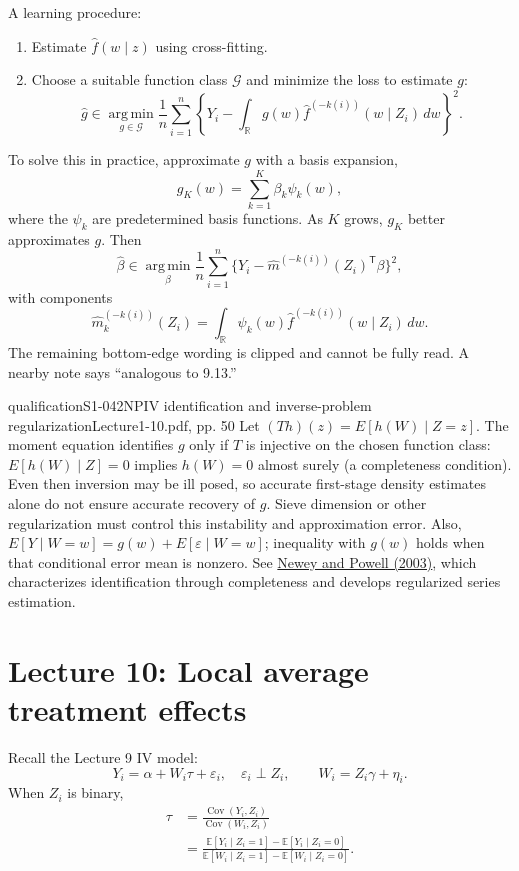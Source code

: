 A learning procedure:
\begin{enumerate}
 \item Estimate $\widehat f(w\mid z)$ using cross-fitting.
 \item Choose a suitable function class $\mathcal G$ and minimize the loss to estimate $g$:
 \[
 \widehat g\in\operatorname*{arg\,min}_{g\in\mathcal G}
 \frac1n\sum_{i=1}^n\left\{
 Y_i-\int_{\mathbb R}g(w)\widehat f^{(-k(i))}(w\mid Z_i)\,dw
 \right\}^{\!2}.\tag{9.16}
 \]
\end{enumerate}
To solve this in practice, approximate $g$ with a basis expansion,
\[
 g_K(w)=\sum_{k=1}^K\beta_k\psi_k(w),
\]
where the $\psi_k$ are predetermined basis functions. As $K$ grows, $g_K$ better approximates $g$. Then
\[
 \widehat\beta\in\operatorname*{arg\,min}_\beta
 \frac1n\sum_{i=1}^n
 \{Y_i-\widehat m^{(-k(i))}(Z_i)^{\mathsf T}\beta\}^2,\tag{9.17}
\]
with components
\[
 \widehat m_k^{(-k(i))}(Z_i)=
 \int_{\mathbb R}\psi_k(w)\widehat f^{(-k(i))}(w\mid Z_i)\,dw.
\]
  The remaining bottom-edge wording is clipped and cannot be fully read. A nearby note says ``analogous to 9.13.''
\begin{reviewnote}{qualification}{S1-042}{NPIV identification and inverse-problem regularization}{Lecture1-10.pdf, pp. 50}
Let $(Th)(z)=E[h(W)\mid Z=z]$. The moment equation identifies $g$ only if $T$ is injective on the chosen function class: $E[h(W)\mid Z]=0$ implies $h(W)=0$ almost surely (a completeness condition). Even then inversion may be ill posed, so accurate first-stage density estimates alone do not ensure accurate recovery of $g$. Sieve dimension or other regularization must control this instability and approximation error. Also, $E[Y\mid W=w]=g(w)+E[\varepsilon\mid W=w]$; inequality with $g(w)$ holds when that conditional error mean is nonzero. See \href{https://doi.org/10.1111/1468-0262.00459}{Newey and Powell (2003)}, which characterizes identification through completeness and develops regularized series estimation.
\end{reviewnote}


\section{Lecture 10: Local average treatment effects}
Recall the Lecture 9 IV model:
\[
 Y_i=\alpha+W_i\tau+\varepsilon_i,\quad\varepsilon_i\perp Z_i,
 \qquad W_i=Z_i\gamma+\eta_i.\tag{10.1}
\]
When $Z_i$ is binary,
\begin{align*}
 \tau&=\frac{\operatorname{Cov}(Y_i,Z_i)}{\operatorname{Cov}(W_i,Z_i)}\\
 &=\frac{\mathbb E[Y_i\mid Z_i=1]-\mathbb E[Y_i\mid Z_i=0]}
 {\mathbb E[W_i\mid Z_i=1]-\mathbb E[W_i\mid Z_i=0]}.\tag{10.2}
\end{align*}

